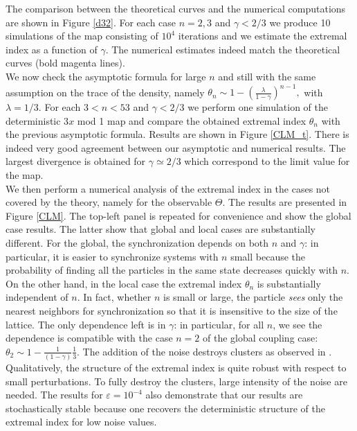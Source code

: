 \documentclass[12pt,reqno,a4paper]{amsart}
\let\epsilon\varepsilon
\begin{document}
The comparison between the theoretical curves and the numerical computations are shown in Figure  \ref{d32}. For each case $n=2,3$ and $\gamma<2/3$ we produce 10 simulations of the map consisting of $10^4$ iterations and we estimate the extremal index as a function of $\gamma$. The numerical estimates indeed match the theoretical curves (bold magenta lines).\\

We now check the asymptotic formula for large $n$ and still with the same assumption on the trace of the density, namely $\theta_n\sim  1-(\frac{\lambda}{1-\gamma})^{n-1},$ with $\lambda=1/3.$ For each $3<n<53$ and $\gamma<2/3$ we perform one simulation of the deterministic 3$x$ mod 1 map and compare the obtained extremal index $\theta_n$ with the previous asymptotic formula. Results are shown in Figure \ref{CLM_t}. There is indeed very good agreement between our asymptotic and numerical results. The largest divergence is obtained for $\gamma\simeq 2/3$ which correspond to the limit value for the map.\\



We then perform a  numerical analysis of the extremal index in the cases not covered by the theory, namely for the observable $\Theta.$  The results are presented in Figure  \ref{CLM}. The top-left panel is repeated for convenience and show the global case results. The latter show that global and local cases are substantially different. For the global, the synchronization depends on both $n$ and $\gamma$: in particular, it is easier to synchronize systems with $n$ small because the probability of finding all the particles in the same state decreases quickly with $n$.  On the other hand, in the local  case the extremal index $\theta_n$ is substantially independent of $n$. In fact, whether $n$ is small or large, the particle \textit{sees} only the nearest neighbors for synchronization so that it is insensitive to the size of the lattice. The only dependence left is in $\gamma$: in particular, for all $n$, we see the dependence is compatible with the case $n=2$ of the global coupling case: $\theta_2\sim 1- \frac{1}{(1-\gamma)}\frac{1}{3}$. The addition of the noise destroys clusters as observed in \cite{AFV}. Qualitatively, the structure of the extremal index is quite robust with respect to small perturbations.   To fully destroy the clusters, large intensity of the noise are needed. The results for $\epsilon=10^{-4}$ also demonstrate that our results are stochastically stable because one   recovers the deterministic structure of the extremal index for low noise values.\\
\end{document}
